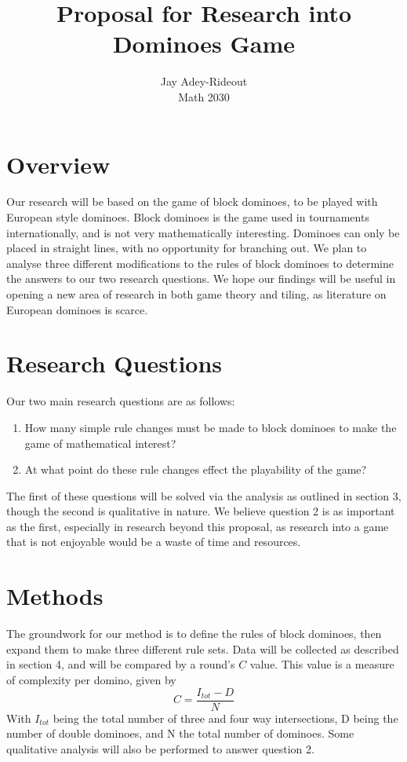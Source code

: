 \documentclass{article}
\title{Proposal for Research into Dominoes Game}
\author{Jay Adey-Rideout\\Math 2030}
\begin{document}
\maketitle

\section{Overview}
Our research will be based on the game of block dominoes, to be played with European style dominoes. Block dominoes is the game used in tournaments internationally, and is not very mathematically interesting. Dominoes can only be placed in straight lines, with no opportunity for branching out. We plan to analyse three different modifications to the rules of block dominoes to determine the answers to our two research questions. We hope our findings will be useful in opening a new area of research in both game theory and tiling, as literature on European dominoes is scarce.

\section{Research Questions}
Our two main research questions are as follows:
\begin{enumerate}
    \item How many simple rule changes must be made to block dominoes to make the game of mathematical interest?
    \item At what point do these rule changes effect the playability of the game?
\end{enumerate}
The first of these questions will be solved via the analysis as outlined in section 3, though the second is qualitative in nature. We believe question 2 is as important as the first, especially in research beyond this proposal, as research into a game that is not enjoyable would be a waste of time and resources.

\section{Methods}
The groundwork for our method is to define the rules of block dominoes, then expand them to make three different rule sets. Data will be collected as described in section 4, and will be compared by a round's \(C\) value. This value is a measure of complexity per domino, given by $$C=\frac{I_{tot}-D}{N}$$ With \(I_{tot}\) being the total number of three and four way intersections, D being the number of double dominoes, and N the total number of dominoes. Some qualitative analysis will also be performed to answer question 2.
\end{document}
